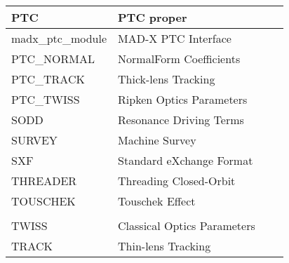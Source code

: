 \begin{table}[H]
\begin{tabular}{l|l|l|l}
PTC                &PTC proper                  &{\color{red}{E.~Forest}} {\color{blue}{KEK}}    & {\color{red}{eforest\_4816968@hotmail.com}}\\\hline
madx\_ptc\_module    &MAD-X PTC Interface         &{\color{green}{F.~Schmidt}}                      & {\color{red}{Frank.Schmidt@cern.ch}}       \\\hline
PTC\_NORMAL        &NormalForm Coefficients     &{\color{green}{tba}}                            & {\color{red}{}}                  	      \\\hline
PTC\_TRACK         &Thick-lens Tracking         &{\color{red}{V.~Kapin}}{\color{blue}{ITEP (RU)}}& {\color{red}{Valery.Kapin@cern.ch}}        \\\hline
PTC\_TWISS         &Ripken Optics Parameters    &{\color{green}{tba}}                            & {\color{red}{}}                            \\\hline
SODD               &Resonance Driving Terms     &{\color{green}{F.~Schmidt}}                     & {\color{red}{Frank.Schmidt@cern.ch}}       \\\hline
SURVEY             &Machine Survey              &{\color{green}{F.~Tecker}}                      & {\color{red}{Frank.Tecker@cern.ch}}        \\\hline
SXF                &Standard eXchange Format    &{\color{red}{N.~Malitsky}} {\color{blue}{BNL}}  & {\color{red}{malitsky@bnl.gov}}            \\\hline
THREADER           &Threading Closed-Orbit      &{\color{green}{T.~Risselada}}                   & {\color{red}{Thys.Risselada@cern.ch}}      \\\hline
TOUSCHEK           &Touschek Effect             &{\color{red}{C.~Milardi}\color{blue}{IFNL/LNF}} & {\color{red}{catia.milardi@lnf.infn.it}}   \\
                   &                            &{\color{green}{F.~Zimmermann}}                  & {\color{red}{Frank.Zimmermann@cern.ch} }   \\\hline
TWISS              &Classical Optics Parameters &{\color{green}{F.~Schmidt}}                     & {\color{red}{Frank.Schmidt@cern.ch}}       \\\hline
TRACK              &Thin-lens Tracking          &{\color{green}{A.~Koschik}}                     & {\color{red}{Alexander.Koschik@cern.ch}}   \\\hline
\end{tabular}
\label{Module_Keepers}
\end{table}
%
